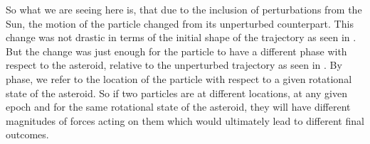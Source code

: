 %
\newline\newline
%
So what we are seeing here is, that due to the inclusion of perturbations from the Sun, the motion of the particle changed from its unperturbed counterpart. This change was not drastic in terms of the initial shape of the trajectory as seen in . But the change was just enough for the particle to have a different phase with respect to the asteroid, relative to the unperturbed trajectory as seen in . By phase, we refer to the location of the particle with respect to a given rotational state of the asteroid. So if two particles are at different locations, at any given epoch and for the same rotational state of the asteroid, they will have different magnitudes of forces acting on them which would ultimately lead to different final outcomes.
